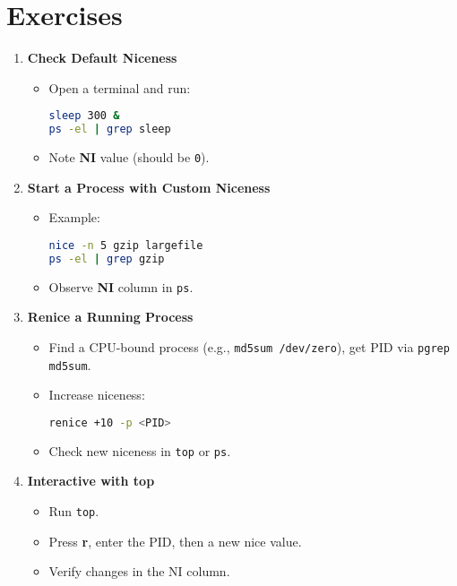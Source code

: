 \documentclass[a4paper]{report}
\begin{document}
\section*{Exercises}

\begin{enumerate}
    \item \textbf{Check Default Niceness}
    \begin{itemize}
        \item Open a terminal and run:
\begin{lstlisting}[language=bash]
sleep 300 &
ps -el | grep sleep
\end{lstlisting}
        \item Note \textbf{NI} value (should be \texttt{0}).
    \end{itemize}

    \item \textbf{Start a Process with Custom Niceness}
    \begin{itemize}
        \item Example:
\begin{lstlisting}[language=bash]
nice -n 5 gzip largefile
ps -el | grep gzip
\end{lstlisting}
        \item Observe \textbf{NI} column in \texttt{ps}.
    \end{itemize}

    \item \textbf{Renice a Running Process}
    \begin{itemize}
        \item Find a CPU-bound process (e.g., \texttt{md5sum /dev/zero}), get PID via \texttt{pgrep md5sum}.
        \item Increase niceness:
\begin{lstlisting}[language=bash]
renice +10 -p <PID>
\end{lstlisting}
        \item Check new niceness in \texttt{top} or \texttt{ps}.
    \end{itemize}

    \item \textbf{Interactive with top}
    \begin{itemize}
        \item Run \texttt{top}.
        \item Press \textbf{r}, enter the PID, then a new nice value.
        \item Verify changes in the NI column.
    \end{itemize}
\end{enumerate}
\end{document}

